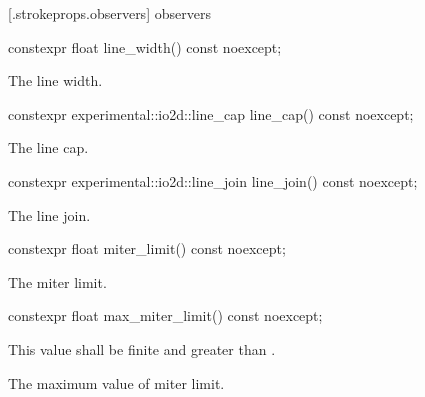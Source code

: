  [\iotwod.strokeprops.observers] { observers}

%
\begin{itemdecl}
constexpr float line_width() const noexcept;
\end{itemdecl}
\begin{itemdescr}
\pnum
\returns
The line width.
\end{itemdescr}

%
\begin{itemdecl}
constexpr experimental::io2d::line_cap line_cap() const noexcept;
\end{itemdecl}
\begin{itemdescr}
\pnum
\returns
The line cap.
\end{itemdescr}

%
\begin{itemdecl}
constexpr experimental::io2d::line_join line_join() const noexcept;
\end{itemdecl}
\begin{itemdescr}
\pnum
\returns
The line join.
\end{itemdescr}

%
\begin{itemdecl}
constexpr float miter_limit() const noexcept;
\end{itemdecl}
\begin{itemdescr}
\pnum
\returns
The miter limit.
\end{itemdescr}

%
\begin{itemdecl}
constexpr float max_miter_limit() const noexcept;
\end{itemdecl}
\begin{itemdescr}
\pnum
\requires
This value shall be finite and greater than .

\pnum
\returns
The  maximum value of miter limit.
\end{itemdescr}
